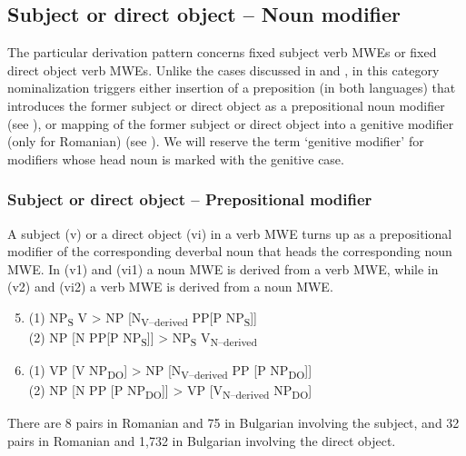 \documentclass[output=paper]{langsci/langscibook}
\begin{document}
\subsection{Subject or direct object – Noun modifier}
\label{section63}

The particular derivation pattern concerns fixed subject verb MWEs or
fixed direct object verb MWEs. Unlike the cases discussed in  and
, in this category nominalization triggers either insertion of a
preposition (in both languages) that introduces the former subject or
direct object as a prepositional noun modifier (see ), or mapping
of the former subject or direct object into a genitive modifier (only
for Romanian) (see ). We will reserve the term ‘genitive modifier’
for modifiers whose head noun is marked with the genitive case.

\subsubsection{Subject or direct object – Prepositional modifier}
\label{section631}

A subject (v) or a direct object (vi) in a verb MWE turns up as a
prepositional modifier of the corresponding deverbal noun that heads
the corresponding noun MWE. In (v1) and (vi1) a noun MWE is derived
from a verb MWE, while in (v2) and (vi2) a verb MWE is derived from a
noun MWE.


\renewcommand{\theenumi}{(\roman{enumi})}%
\begin{enumerate}
 \setcounter{enumi}{4}
\item  (1) NP\textsubscript{S} V > NP [N\textsubscript{V–derived }PP[P
NP\textsubscript{S}]] \\
(2) NP [N PP[P NP\textsubscript{S}]] > NP\textsubscript{S}
V\textsubscript{N–derived} 
\end{enumerate}

\renewcommand{\theenumi}{(\roman{enumi})}%
\begin{enumerate}
 \setcounter{enumi}{5} 
 \item (1) VP [V NP\textsubscript{DO}] > NP [N\textsubscript{V–derived} PP
[P NP\textsubscript{DO}]] \\ 
(2) NP [N PP [P NP\textsubscript{DO}]] > VP
[V\textsubscript{N–derived} NP\textsubscript{DO}] 
\end{enumerate}


There are 8 pairs in Romanian and 75 in Bulgarian involving the subject,
and 32 pairs in Romanian and 1,732 in Bulgarian involving the direct
object. 
\end{document}
